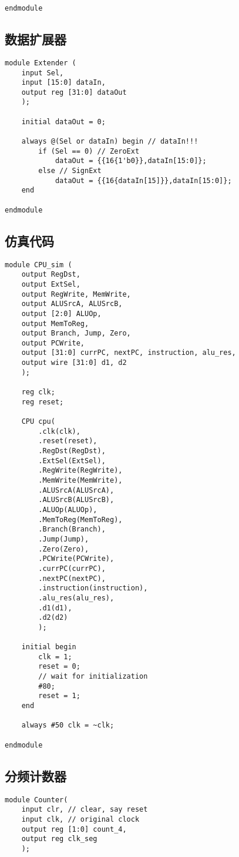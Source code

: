 \begin{multicols}{2}
\begin{lstlisting}
endmodule
\end{lstlisting}

\subsection{数据扩展器}
\begin{lstlisting}
module Extender (
	input Sel,
	input [15:0] dataIn,
	output reg [31:0] dataOut
	);

	initial dataOut = 0;

	always @(Sel or dataIn) begin // dataIn!!!
		if (Sel == 0) // ZeroExt
			dataOut = {{16{1'b0}},dataIn[15:0]};
		else // SignExt
			dataOut = {{16{dataIn[15]}},dataIn[15:0]};
	end

endmodule
\end{lstlisting}

\subsection{仿真代码}
\begin{lstlisting}
module CPU_sim (
	output RegDst,
	output ExtSel,
	output RegWrite, MemWrite,
	output ALUSrcA, ALUSrcB,
	output [2:0] ALUOp,
	output MemToReg,
	output Branch, Jump, Zero,
	output PCWrite,
	output [31:0] currPC, nextPC, instruction, alu_res,
	output wire [31:0] d1, d2
	);
	
	reg clk;
	reg reset;

	CPU cpu(
		.clk(clk),
		.reset(reset),
		.RegDst(RegDst),
		.ExtSel(ExtSel),
		.RegWrite(RegWrite),
		.MemWrite(MemWrite),
		.ALUSrcA(ALUSrcA),
		.ALUSrcB(ALUSrcB),
		.ALUOp(ALUOp),
		.MemToReg(MemToReg),
		.Branch(Branch),
		.Jump(Jump),
		.Zero(Zero),
		.PCWrite(PCWrite),
		.currPC(currPC),
		.nextPC(nextPC),
		.instruction(instruction),
		.alu_res(alu_res),
		.d1(d1),
		.d2(d2)
		);

	initial begin
		clk = 1;
		reset = 0;
		// wait for initialization
		#80;
		reset = 1;
	end

	always #50 clk = ~clk;

endmodule
\end{lstlisting}

\subsection{分频计数器}
\begin{lstlisting}
module Counter(
    input clr, // clear, say reset
    input clk, // original clock
    output reg [1:0] count_4,
    output reg clk_seg
    );
    

\end{lstlisting}
\end{multicols}
